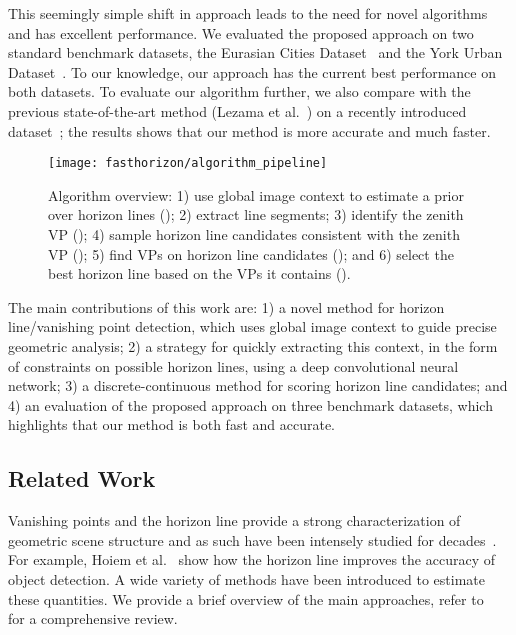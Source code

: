 This seemingly simple shift in approach leads to the need for novel
algorithms and has excellent performance. We evaluated the proposed
approach on two standard benchmark datasets, the Eurasian Cities
Dataset~\cite{geoparser2010} and the York Urban
Dataset~\cite{edgebased2008}. To our knowledge, our approach has the
current best performance on both datasets. To evaluate our algorithm
further, we also compare with the previous state-of-the-art method
(Lezama et al.~\cite{alignment2014}) on a recently introduced
dataset~\cite{authors2016deephorizon}; the results shows that our
method is more accurate and much faster.

\begin{figure*}
  \centering
  \texttt{[image: fasthorizon/algorithm\_pipeline]}
  \caption{Algorithm overview: 1) use global image context to estimate
    a prior over horizon lines (); 2) extract
    line segments; 3) identify the zenith VP
    (); 4) sample horizon line candidates
    consistent with the zenith VP (); 5) find
    VPs on horizon line candidates (); and 6)
    select the best horizon line based on the VPs it contains
    ().}
  \label{fig:pipeline}
\end{figure*}


The main contributions of this work
are: 1) a novel method for horizon line/vanishing point detection,
which uses global image context to guide precise geometric analysis;
2) a strategy for quickly extracting this context, in the form of
constraints on possible horizon lines, using a deep convolutional
neural network; 3) a discrete-continuous method for scoring horizon
line candidates; and 4) an evaluation of the proposed approach on
three benchmark datasets, which highlights that our method is both
fast and accurate.

\subsection{Related Work}
\label{sec:relatedwork}

Vanishing points and the horizon line provide a strong
characterization of geometric scene structure and as such have been
intensely studied for
decades~\cite{barnard1983interpreting,magee1984determining}.  For
example, Hoiem et al.~\cite{hoiem2008putting} show how the horizon
line improves the accuracy of object detection.  A wide variety of
methods have been introduced to estimate these quantities.  We provide
a brief overview of the main approaches, refer
to~\cite{szeliski2010computer} for a comprehensive review. 

